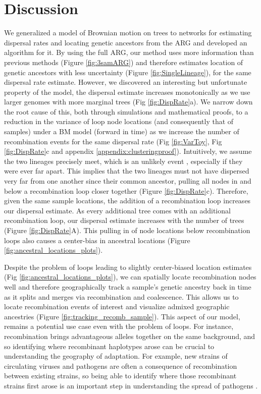 \section{Discussion}

We generalized a model of Brownian motion on trees to networks for estimating dispersal rates and locating genetic ancestors from the ARG and developed an algorithm for it. By using the full ARG, our method uses more information than previous methods (Figure \ref{fig:3samARG}) and therefore estimates location of genetic ancestors with less uncertainty (Figure \ref{fig:SingleLineage}), for the same dispersal rate estimate. However, we discovered an interesting but unfortunate property of the model, the dispersal estimate increases monotonically as we use larger genomes with more marginal trees (Fig \ref{fig:DispRate}a). We narrow down the root cause of this, both through simulations and mathematical proofs, to a reduction in the variance of loop node locations (and consequently that of samples) under a BM model (forward in time) as we increase the number of recombination events for the same dispersal rate (Fig \ref{fig:VarToy}, Fig \ref{fig:DispRate}c and appendix \ref{appendix:clusteringproof}). Intuitively, we assume the two lineages precisely meet, which is an unlikely event \citep{Etheridge2019}, especially if they were ever far apart. This implies that the two lineages must not have dispersed very far from one another since their common ancestor, pulling all nodes in and below a recombination loop closer together (Figure \ref{fig:DispRate}c). Therefore, given the same sample locations, the addition of a recombination loop increases our dispersal estimate. As every additional tree comes with an additional recombination loop, our dispersal estimate increases with the number of trees (Figure \ref{fig:DispRate}A). This pulling in of node locations below recombination loops also causes a center-bias in ancestral locations (Figure \ref{fig:ancestral_locations_plots}).

Despite the problem of loops leading to slightly center-biased location estimates (Fig \ref{fig:ancestral_locations_plots}), we can spatially locate recombination nodes well and therefore geographically track a sample's genetic ancestry back in time as it splits and merges via recombination and coalescence. This allows us to locate recombination events of interest and visualize admixed geographic ancestries ({Figure \ref{fig:tracking_recomb_sample}}). This aspect of our model, remains a potential use case even with the problem of loops. For instance, recombination brings advantageous alleles together on the same background, and so identifying where recombinant haplotypes arose can be crucial to understanding the geography of adaptation. For example, new strains of circulating viruses and pathogens are often a consequence of recombination between existing strains, so being able to identify where those recombinant strains first arose is an important step in understanding the spread of pathogens \citep{tamura_virological_2023, ignatieva_ongoing_2022}.

